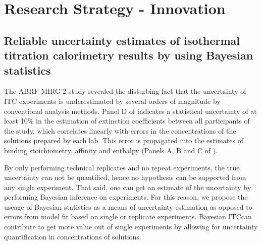 \documentclass[10pt,final]{article}
\newif\ifinstr
\newcommand{\instr}[1]{\ifdraft{\ifinstr {\color{cyan}\emph{#1}} \fi}{}}
\begin{document}
\section*{Research Strategy - Innovation}
\instr{Explain how your proposal differs from what others have tried.}
\subsection*{Reliable uncertainty estimates of isothermal titration calorimetry results by using Bayesian statistics}
The ABRF-MIRG'2 study revealed the disturbing fact that the uncertainty of ITC experiments is underestimated by several orders of magnitude by conventional analysis methods\cite{Myszka2003a}. Panel D of  indicates a statistical uncertainty of at least 10\% in the estimation of extinction coefficients between all participants of the study, which correlates linearly with errors in the concentrations of the solutions prepared by each lab. This error is propagated into the estimates of binding stoichiometry, affinity and enthalpy  (Panels A, B and C of ).

By only performing technical replicates  and no repeat experiments, the true uncertainty can not be quantified, hence no hypothesis can be supported from any single experiment\cite{Vaux2012a}. That said, one can get an estimate of the uncertainty by performing Bayesian inference on experiments. For this reason, we propose the useage of Bayesian statistics as a means of uncertainty estimation as opposed to errors from model fit based on single or replicate experiments. Bayesian ITC\texttrademark can contribute to get more value out of single experiments by allowing for uncertainty quantification in concentrations of solutions. 
\end{document}
